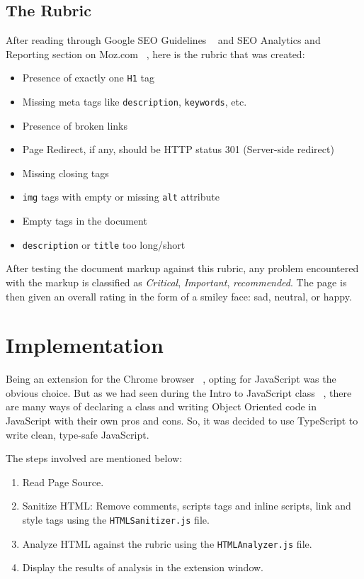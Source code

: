 \documentclass[14pt]{article}
\newcommand{\codeword}{\texttt}
\begin{document}
\subsection{The Rubric}
After reading through Google SEO Guidelines ~\cite{googleSEO} and SEO Analytics and Reporting section on Moz.com ~\cite{mozSEO}, here is the rubric that was created:

\begin{itemize}
\item{Presence of exactly one \codeword{H1} tag}
\item{Missing meta tags like \codeword{description}, \codeword{keywords}, etc.}
\item{Presence of broken links}
\item{Page Redirect, if any, should be HTTP status 301 (Server-side redirect)}
\item{Missing closing tags}
\item{\codeword{img} tags with empty or missing \codeword{alt} attribute}
\item{Empty tags in the document}
\item{\codeword{description} or \codeword{title} too long/short}
\end{itemize}

After testing the document markup against this rubric, any problem encountered with the markup is classified as \textit{Critical}, \textit{Important}, \textit{recommended}. The page is then given an overall rating in the form of a smiley face: sad, neutral, or happy.


\smallskip

\section{Implementation}
Being an extension for the Chrome browser ~\cite{gExt}, opting for JavaScript was the obvious choice. But as we had seen during the Intro to JavaScript class ~\cite{lectureslides}, there are many ways of declaring a class and writing Object Oriented code in JavaScript with their own pros and cons. So, it was decided to use TypeScript to write clean, type-safe JavaScript. 

The steps involved are mentioned below:

\begin{enumerate}
  \item Read Page Source.
  \item Sanitize HTML: Remove comments, scripts tags and inline scripts, link and style tags using the \codeword{HTMLSanitizer.js} file.
  \item Analyze HTML against the rubric using the \codeword{HTMLAnalyzer.js} file.
  \item Display the results of analysis in the extension window.
\end{enumerate}
\end{document}
